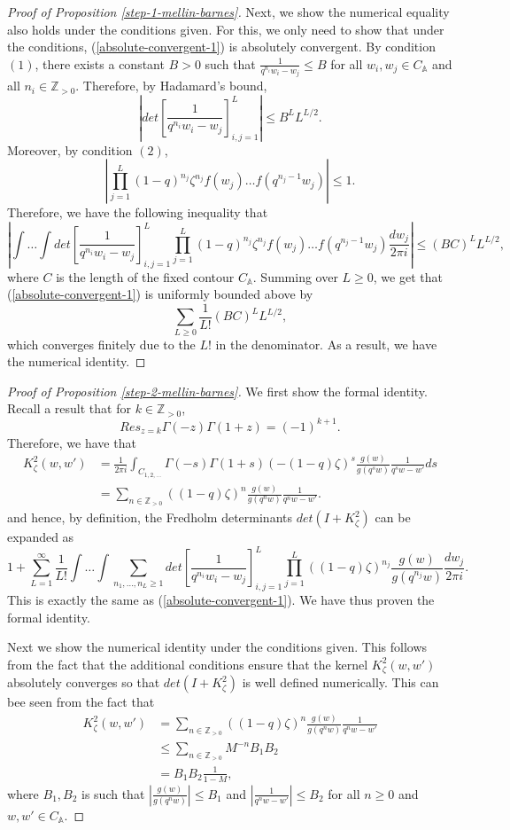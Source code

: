 \begin{proof}[Proof of Proposition \ref{step-1-mellin-barnes}]
Next, we show the numerical equality also holds under the conditions given. For this, we only need to show that under the conditions, (\ref{absolute-convergent-1}) is absolutely convergent. By condition $(1)$, there exists a constant $B > 0$ such that $\frac{1}{q^{n_i} w_i - w_j} \le B$ for all $w_i, w_j \in C_{\mathbb{A}}$ and all $n_i \in \mathbb{Z}_{>0}$. Therefore, by Hadamard's bound, $$\left| det\left[ \frac{1}{q^{n_i} w_i - w_j} \right]_{i,j=1}^{L} \right| \le B^L L^{L/2}.$$
Moreover, by condition $(2)$, $$\left| \prod_{j=1}^{L} (1-q)^{n_j} \zeta^{n_j} f(w_j) \dots f(q^{n_j-1} w_j) \right| \le 1.$$ Therefore, we have the following inequality that 
$$\left| \int \dots \int  det\left[ \frac{1}{q^{n_i} w_i - w_j} \right]_{i,j=1}^{L} \prod_{j=1}^{L} (1-q)^{n_j} \zeta^{n_j} f(w_j) \dots f(q^{n_j-1} w_j) \frac{dw_j}{2 \pi i} \right| \le (BC)^L L^{L/2},$$
where $C$ is the length of the fixed contour $C_{\mathbb{A}}$. Summing over $L \ge 0$, we get that (\ref{absolute-convergent-1}) is uniformly bounded above by $$\sum_{L \ge 0} \frac{1}{L!}(BC)^L L^{L/2},$$ which converges finitely due to the $L!$ in the denominator. As a result, we have the numerical identity.
\end{proof}
\begin{proof}[Proof of Proposition \ref{step-2-mellin-barnes}]
We first show the formal identity. Recall a result that for $k \in \mathbb{Z}_{> 0}$, $$Res_{z = k} \Gamma(-z) \Gamma(1+z) = (-1)^{k+1}.$$ Therefore, we have that
\begin{align*}
K_{\zeta}^2(w,w') &= \frac{1}{2 \pi i} \int_{C_{1,2,\dots}} \Gamma(-s) \Gamma(1+s) (-(1-q)\zeta)^s \frac{g(w)}{g(q^sw)} \frac{1}{q^sw - w'} ds\\
&= \sum_{n \in \mathbb{Z}_{>0}} ((1-q) \zeta)^n \frac{g(w)}{g(q^nw)} \frac{1}{q^n w - w'}.
\end{align*}
and hence, by definition, the Fredholm determinants $det(I+K_{\zeta}^2)$ can be expanded as
$$1 + \sum_{L=1}^{\infty} \frac{1}{L!} \int \dots \int \sum_{n_1, \dots, n_L \ge 1} det\left[ \frac{1}{q^{n_i} w_i - w_j} \right]_{i,j = 1}^{L} \prod_{j=1}^{L} ((1-q)\zeta)^{n_j} \frac{g(w)}{g(q^{n_j} w)} \frac{dw_j}{2 \pi i}.$$
This is exactly the same as (\ref{absolute-convergent-1}). We have thus proven the formal identity.

Next we show the numerical identity under the conditions given. This follows from the fact that the additional conditions ensure that the kernel $K_{\zeta}^2(w,w')$ absolutely converges so that $det(I+K_{\zeta}^2)$ is well defined numerically. This can bee seen from the fact that 
\begin{align*}
K_{\zeta}^2(w,w') &= \sum_{n \in \mathbb{Z}_{>0}} ((1-q) \zeta)^n \frac{g(w)}{g(q^nw)} \frac{1}{q^n w - w'}\\
&\le \sum_{n \in \mathbb{Z}_{>0}} M^{-n} B_1 B_2\\
&= B_1 B_2 \frac{1}{1-M},
\end{align*}
where $B_1, B_2$ is such that $\left| \frac{g(w)}{g(q^nw)} \right| \le B_1$ and $\left| \frac{1}{q^n w - w'} \right| \le B_2$ for all $n \ge 0$ and $w, w' \in C_{\mathbb{A}}$.
\end{proof}

